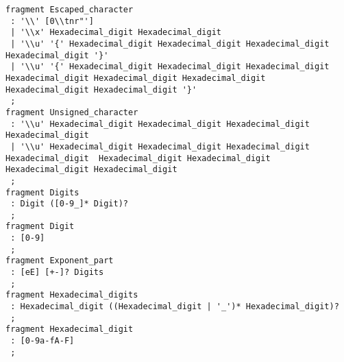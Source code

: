 \begin{lstlisting}[basicstyle=\scriptsize]
fragment Escaped_character
 : '\\' [0\\tnr"']
 | '\\x' Hexadecimal_digit Hexadecimal_digit
 | '\\u' '{' Hexadecimal_digit Hexadecimal_digit Hexadecimal_digit Hexadecimal_digit '}'
 | '\\u' '{' Hexadecimal_digit Hexadecimal_digit Hexadecimal_digit Hexadecimal_digit Hexadecimal_digit Hexadecimal_digit Hexadecimal_digit Hexadecimal_digit '}'
 ;
fragment Unsigned_character
 : '\\u' Hexadecimal_digit Hexadecimal_digit Hexadecimal_digit Hexadecimal_digit
 | '\\u' Hexadecimal_digit Hexadecimal_digit Hexadecimal_digit Hexadecimal_digit  Hexadecimal_digit Hexadecimal_digit Hexadecimal_digit Hexadecimal_digit
 ;
fragment Digits
 : Digit ([0-9_]* Digit)?
 ;
fragment Digit
 : [0-9]
 ;
fragment Exponent_part
 : [eE] [+-]? Digits
 ;
fragment Hexadecimal_digits
 : Hexadecimal_digit ((Hexadecimal_digit | '_')* Hexadecimal_digit)?
 ;
fragment Hexadecimal_digit
 : [0-9a-fA-F]
 ;
\end{lstlisting}